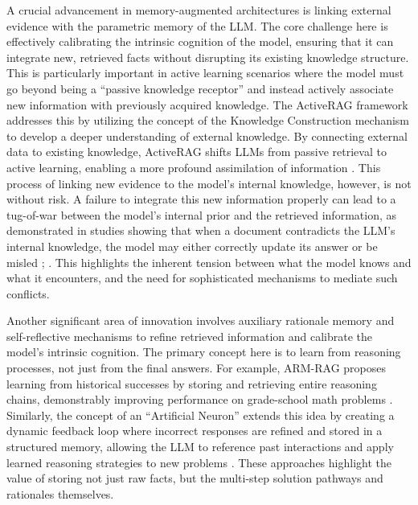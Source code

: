 \documentclass[11pt]{article}
\begin{document}
A crucial advancement in memory-augmented architectures is linking external evidence with the parametric memory of the LLM. The core challenge here is effectively calibrating the intrinsic cognition of the model, ensuring that it can integrate new, retrieved facts without disrupting its existing knowledge structure. This is particularly important in active learning scenarios where the model must go beyond being a ``passive knowledge receptor'' and instead actively associate new information with previously acquired knowledge. The ActiveRAG framework addresses this by utilizing the concept of the Knowledge Construction mechanism to develop a deeper understanding of external knowledge. By connecting external data to existing knowledge, ActiveRAG shifts LLMs from passive retrieval to active learning, enabling a more profound assimilation of information \cite{ref36}. This process of linking new evidence to the model's internal knowledge, however, is not without risk. A failure to integrate this new information properly can lead to a tug-of-war between the model's internal prior and the retrieved information, as demonstrated in studies showing that when a document contradicts the LLM's internal knowledge, the model may either correctly update its answer or be misled \cite{ref37}; \cite{ref28,ref62,ref63}. This highlights the inherent tension between what the model knows and what it encounters, and the need for sophisticated mechanisms to mediate such conflicts.

Another significant area of innovation involves auxiliary rationale memory and self-reflective mechanisms to refine retrieved information and calibrate the model's intrinsic cognition. The primary concept here is to learn from reasoning processes, not just from the final answers. For example, ARM-RAG proposes learning from historical successes by storing and retrieving entire reasoning chains, demonstrably improving performance on grade-school math problems \cite{ref59}. Similarly, the concept of an ``Artificial Neuron'' extends this idea by creating a dynamic feedback loop where incorrect responses are refined and stored in a structured memory, allowing the LLM to reference past interactions and apply learned reasoning strategies to new problems \cite{ref64}. These approaches highlight the value of storing not just raw facts, but the multi-step solution pathways and rationales themselves.
\end{document}
